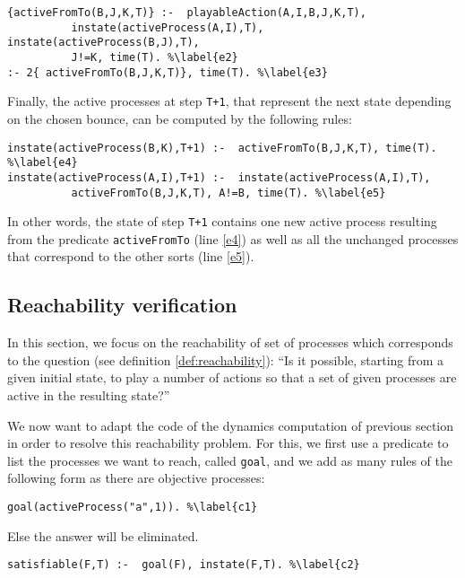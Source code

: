 \begin{lstlisting}
{activeFromTo(B,J,K,T)} :-  playableAction(A,I,B,J,K,T),
          instate(activeProcess(A,I),T), instate(activeProcess(B,J),T),
          J!=K, time(T). %\label{e2}
:- 2{ activeFromTo(B,J,K,T)}, time(T). %\label{e3}
\end{lstlisting}

Finally, the active processes at step \texttt{T+1},
that represent the next state depending on the chosen bounce,
can be computed by the following rules:
\begin{lstlisting}
instate(activeProcess(B,K),T+1) :-  activeFromTo(B,J,K,T), time(T). %\label{e4}
instate(activeProcess(A,I),T+1) :-  instate(activeProcess(A,I),T),
          activeFromTo(B,J,K,T), A!=B, time(T). %\label{e5}
\end{lstlisting}
In other words, the state of step \texttt{T+1} contains one new active process
resulting from the predicate \texttt{activeFromTo} (line \ref{e4})
as well as all the unchanged processes that correspond to the other sorts (line \ref{e5}).

%

\subsection{Reachability verification}
In this section, we focus on the reachability of set of processes which corresponds to the question (see definition \ref{def:reachability}):
“Is it possible, starting from a given initial state, to play a number of actions so that a set of given processes are active in the resulting state?”

We now want to adapt the code of the dynamics computation of previous section in order to resolve this reachability problem.
For this, we first use a predicate to list the processes we want to reach, called \texttt{goal}, and we add as many rules of the following form as there are objective processes:
\begin{lstlisting}
goal(activeProcess("a",1)). %\label{c1}
\end{lstlisting}
%
Else the answer will be eliminated.
\begin{lstlisting}
satisfiable(F,T) :-  goal(F), instate(F,T). %\label{c2}
\end{lstlisting}

